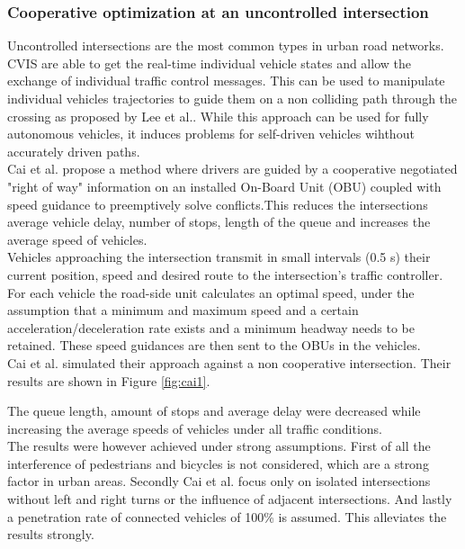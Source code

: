 \documentclass{sig-alternate}
\begin{document}
\subsubsection{Cooperative optimization at an uncontrolled intersection}
\label{uncontrolled}
Uncontrolled intersections are the most common types in urban road networks. CVIS are able to get the real-time individual vehicle states and allow the exchange of individual traffic control messages. This can be used to manipulate individual vehicles trajectories to guide them on a non colliding path through the crossing as proposed by Lee et al.\cite{lee2012development}. While this approach can be used for fully autonomous vehicles, it induces problems for self-driven vehicles wihthout accurately driven paths. \\
Cai et al.\cite{6957666} propose a method where drivers are guided by a cooperative negotiated "right of way" information on an installed On-Board Unit (OBU) coupled with speed guidance to preemptively solve conflicts.This reduces the intersections average vehicle delay, number of stops, length of the queue and increases the average speed of vehicles.\\
Vehicles approaching the intersection transmit in small intervals (0.5 s) their current position, speed and desired route to the intersection's traffic controller. For each vehicle the road-side unit calculates an optimal speed, under the assumption that a minimum and maximum speed and a certain acceleration/deceleration rate exists and a minimum headway needs to be retained. These speed guidances are then sent to the OBUs in the vehicles.\\ 
Cai et al. simulated their approach against a non cooperative intersection. Their results are shown in Figure \ref{fig:cai1}. 
\begin{figure*} 
\centering
{}
\caption{Unsignalized cooperative optimization simulation results}
\label{fig:cai1}
\end{figure*}
The queue length, amount of stops and average delay were decreased while increasing the average speeds of vehicles under all traffic conditions. \\
The results were however achieved under strong assumptions. First of all the interference of pedestrians and bicycles is not considered, which are a strong factor in urban areas. Secondly Cai et al. focus only on isolated intersections without left and right turns or the influence of adjacent intersections. And lastly a penetration rate of connected vehicles of 100\% is assumed. This alleviates the results strongly. \\ 
\end{document}

